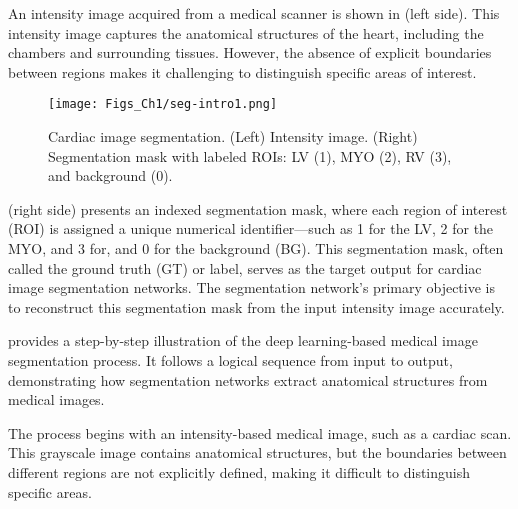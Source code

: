 An intensity image acquired from a medical scanner is shown in  (left side). This intensity image captures the anatomical structures of the heart, including the chambers and surrounding tissues. However, the absence of explicit boundaries between regions makes it challenging to distinguish specific areas of interest.

\begin{figure}[b!]
\centering
\texttt{[image: Figs\_Ch1/seg-intro1.png]}
\caption{ Cardiac image segmentation. (Left) Intensity image. (Right) Segmentation mask with labeled ROIs: LV (1), MYO (2), RV (3), and background (0).}
\label{fig1_2}
\end{figure}

 (right side) presents an indexed segmentation mask, where each region of interest (ROI) is assigned a unique numerical identifier—such as 1 for the LV, 2 for the MYO, and 3 for, and 0 for the background (BG). This segmentation mask, often called the ground truth (GT) or label, serves as the target output for cardiac image segmentation networks. The segmentation network's primary objective is to reconstruct this segmentation mask from the input intensity image accurately.



 provides a step-by-step illustration of the deep learning-based medical image segmentation process. It follows a logical sequence from input to output, demonstrating how segmentation networks extract anatomical structures from medical images.

The process begins with an intensity-based medical image, such as a cardiac scan. This grayscale image contains anatomical structures, but the boundaries between different regions are not explicitly defined, making it difficult to distinguish specific areas.

